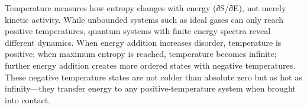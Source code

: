 Temperature measures how entropy changes with energy (∂S/∂E), not merely kinetic activity. While unbounded systems such as ideal gases can only reach positive temperatures, quantum systems with finite energy spectra reveal different dynamics. When energy addition increases disorder, temperature is positive; when maximum entropy is reached, temperature becomes infinite; further energy addition creates more ordered states with negative temperatures. These negative temperature states are not colder than absolute zero but as hot as infinity—they transfer energy to any positive-temperature system when brought into contact.